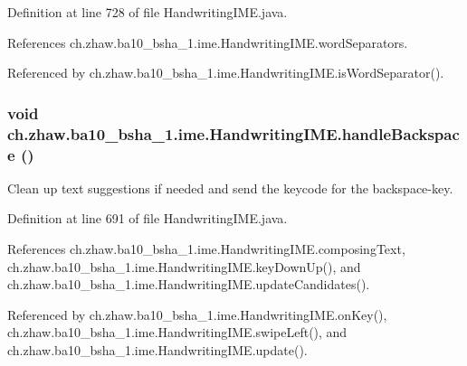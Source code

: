 Definition at line 728 of file HandwritingIME.java.

References ch.zhaw.ba10\_\-bsha\_\-1.ime.HandwritingIME.wordSeparators.

Referenced by ch.zhaw.ba10\_\-bsha\_\-1.ime.HandwritingIME.isWordSeparator().\hypertarget{classch_1_1zhaw_1_1ba10__bsha__1_1_1ime_1_1HandwritingIME_a629b38e45bc795d46cb7ce1c79bc1def}{
\subsubsection[{handleBackspace}]{\setlength{\rightskip}{0pt plus 5cm}void ch.zhaw.ba10\_\-bsha\_\-1.ime.HandwritingIME.handleBackspace ()}}
\label{classch_1_1zhaw_1_1ba10__bsha__1_1_1ime_1_1HandwritingIME_a629b38e45bc795d46cb7ce1c79bc1def}
Clean up text suggestions if needed and send the keycode for the backspace-\/key. 

Definition at line 691 of file HandwritingIME.java.

References ch.zhaw.ba10\_\-bsha\_\-1.ime.HandwritingIME.composingText, ch.zhaw.ba10\_\-bsha\_\-1.ime.HandwritingIME.keyDownUp(), and ch.zhaw.ba10\_\-bsha\_\-1.ime.HandwritingIME.updateCandidates().

Referenced by ch.zhaw.ba10\_\-bsha\_\-1.ime.HandwritingIME.onKey(), ch.zhaw.ba10\_\-bsha\_\-1.ime.HandwritingIME.swipeLeft(), and ch.zhaw.ba10\_\-bsha\_\-1.ime.HandwritingIME.update().

